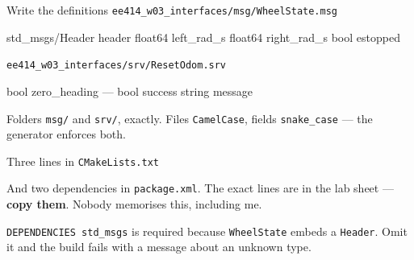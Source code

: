 \documentclass[aspectratio=169]{beamer}
\begin{document}
\begin{frame}[fragile]{Write the definitions}
  {\footnotesize\texttt{ee414\_w03\_interfaces/msg/WheelState.msg}}
  \begin{spec}
std_msgs/Header  header
float64          left_rad_s
float64          right_rad_s
bool             estopped
  \end{spec}

  {\footnotesize\texttt{ee414\_w03\_interfaces/srv/ResetOdom.srv}}
  \begin{spec}
bool zero_heading
---
bool success
string message
  \end{spec}

  \footnotesize
  Folders \texttt{msg/} and \texttt{srv/}, exactly. Files \texttt{CamelCase}, fields
  \texttt{snake\_case} --- the generator enforces both.
\end{frame}

\begin{frame}[fragile]{Three lines in \texttt{CMakeLists.txt}}

  \vspace{0.4em}
  \small
  And two dependencies in \texttt{package.xml}. The exact lines are in the lab sheet ---
  \textbf{copy them}. Nobody memorises this, including me.

  \vspace{0.4em}
  \footnotesize
  \texttt{DEPENDENCIES std\_msgs} is required because \texttt{WheelState} embeds a
  \texttt{Header}. Omit it and the build fails with a message about an unknown type.
\end{frame}
\end{document}
